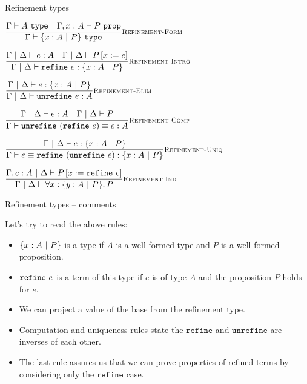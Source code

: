 \documentclass{beamer}
\begin{document}
\begin{frame}{Refinement types}

\begin{center}
  $\infrule[Refinement-Form]{\type{A} \quad \prop[\extend{\Gamma}{x}{A}]{P}}{\type{\refinement{x}{A}{P}}}$

  \vspace{1em}

  $\infrule[Refinement-Intro]{\typing[\Gamma \pipe \Delta]{e}{A} \quad \holds{\subst{P}{x}{e}}}{\typing[\Gamma \pipe \Delta]{\refine{e}}{\refinement{x}{A}{P}}}$

  \vspace{1em}

  $\infrule[Refinement-Elim]{\typing[\Gamma \pipe \Delta]{e}{\refinement{x}{A}{P}}}{\typing[\Gamma \pipe \Delta]{\unrefine{e}}{A}}$

  \vspace{1em}

  $\infrule[Refinement-Comp]{\typing[\Gamma \pipe \Delta]{e}{A} \quad \holds{P}}{\compeq{\unrefine{(\refine{e})}}{e}{A}}$

  \vspace{1em}

  $\infrule[Refinement-Uniq]{\typing[\Gamma \pipe \Delta]{e}{\refinement{x}{A}{P}}}{\compeq{e}{\refine{(\unrefine{e})}}{\refinement{x}{A}{P}}}$

  \vspace{1em}

  $\infrule[Refinement-Ind]{\holds[\extend{\Gamma}{e}{A}][\Delta]{\subst{P}{x}{\refine{e}}}}{\holds{\All{x}[\refinement{y}{A}{P}]{P}}}$
\end{center}

\end{frame}

\begin{frame}{Refinement types -- comments}

Let's try to read the above rules:
\begin{itemize}
  \item $\{x : A\ |\ P\}$ is a type if $A$ is a well-formed type and $P$ is a well-formed proposition.
  \item $\texttt{refine}\ e$ is a term of this type if $e$ is of type $A$ and the proposition $P$ holds for $e$.
  \item We can project a value of the base from the refinement type.
  \item Computation and uniqueness rules state the $\texttt{refine}$ and $\texttt{unrefine}$ are inverses of each other.
  \item The last rule assures us that we can prove properties of refined terms by considering only the $\texttt{refine}$ case.
\end{itemize}

\end{frame}
\end{document}

